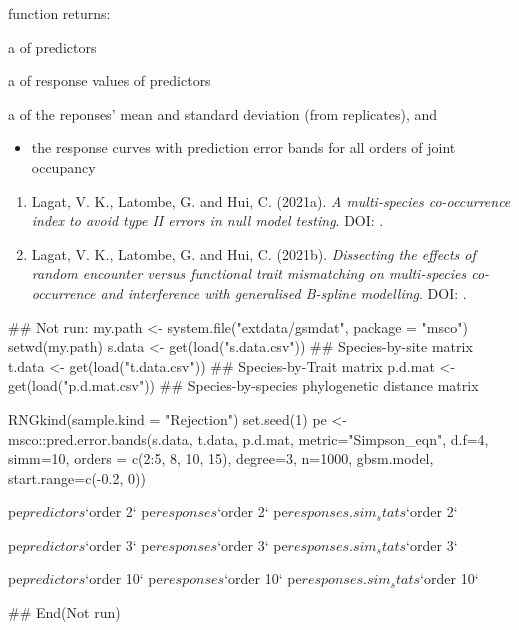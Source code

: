 \documentclass[a4paper]{book}
\begin{document}
%
\begin{Value}
 function returns:
\begin{ldescription}
\item[\code{\code{predictors}}] a  of predictors
\item[\code{\code{responses}}] a  of response values of predictors
\item[\code{\code{responses.sim\_stats}}] a  of the reponses' mean and standard deviation
(from  replicates), and
\end{ldescription}
\begin{itemize}

\item{} the response curves with prediction error bands for all orders of joint occupancy

\end{itemize}

\end{Value}
%
\begin{References}\relax
\begin{enumerate}

\item{} Lagat, V. K., Latombe, G. and Hui, C. (2021a). \emph{A multi-species co-occurrence
index to avoid type II errors in null model testing}. DOI: .

\item{} Lagat, V. K., Latombe, G. and Hui, C. (2021b). \emph{Dissecting the effects of random
encounter versus functional trait mismatching on multi-species co-occurrence and
interference with generalised B-spline modelling}. DOI: .


\end{enumerate}

\end{References}
%
\begin{Examples}
\begin{ExampleCode}
## Not run: 
 my.path <- system.file("extdata/gsmdat", package = "msco")
 setwd(my.path)
 s.data <- get(load("s.data.csv")) ## Species-by-site matrix
 t.data <- get(load("t.data.csv")) ## Species-by-Trait matrix
 p.d.mat <- get(load("p.d.mat.csv")) ## Species-by-species phylogenetic distance matrix

 RNGkind(sample.kind = "Rejection")
 set.seed(1)
 pe <- msco::pred.error.bands(s.data, t.data, p.d.mat, metric="Simpson_eqn", d.f=4, simm=10,
  orders = c(2:5, 8, 10, 15), degree=3, n=1000, gbsm.model, start.range=c(-0.2, 0))

 pe$predictors$`order 2`
 pe$responses$`order 2`
 pe$responses.sim_stats$`order 2`

 pe$predictors$`order 3`
 pe$responses$`order 3`
 pe$responses.sim_stats$`order 3`

 pe$predictors$`order 10`
 pe$responses$`order 10`
 pe$responses.sim_stats$`order 10`

 
## End(Not run)

\end{ExampleCode}
\end{Examples}
\end{document}
